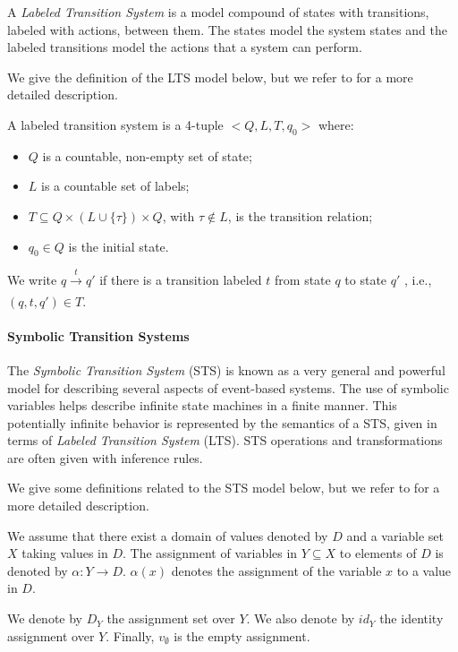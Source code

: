 A \textit{Labeled Transition System} is a model compound of
states with transitions, labeled with actions, between them.
The states model the system states and the labeled transitions
model the actions that a system can perform.

We give the definition of the LTS model below, but we refer to
\cite{ltsTretmans} for a more detailed description.

\begin{definition}
    A labeled transition system is a 4-tuple $<Q,L,T,q_0>$ where:

    \begin{itemize}
    \item $Q$ is a countable, non-empty set of state;

    \item $L$ is a countable set of labels;

    \item $T \subseteq Q \times (L \cup \{\tau\}) \times Q$, with
    $\tau \not\in L$, is the transition relation;

    \item $q_0 \in Q$ is the initial state.

    \end{itemize}

    We write $q \xrightarrow[]{t} q'$ if there is a transition
    labeled $t$ from state $q$ to state $q'$ , i.e., $(q, t, q')
    \in T$.

	\label{def:lts}
\end{definition}


\paragraph{Symbolic Transition Systems}
\label{sec:definitions:sts}

The \textit{Symbolic Transition System} (STS) is known as a very
general and powerful model for describing several aspects of
event-based systems. The use of symbolic variables
helps describe infinite state machines in a finite manner. This
potentially infinite behavior is represented by the semantics of
a STS, given in terms of \textit{Labeled Transition System}
(LTS). STS operations and transformations are often given with
inference rules.

We give some definitions related to the STS model below, but we
refer to \cite{FTW05} for a more detailed description.

\begin{definition}
We assume that there exist a domain of values denoted by $D$ and
a variable set $X$ taking values in $D$. The assignment of
variables in $Y \subseteq X$ to elements of $D$ is denoted by
$\alpha: Y \rightarrow D$. $\alpha(x)$ denotes the assignment of
the variable $x$ to a value in $D$.

We denote by $D_Y$ the assignment set over $Y$. We also denote by
$id_Y$ the identity assignment over $Y$. Finally, $v_\emptyset$
is the empty assignment.
\end{definition}


